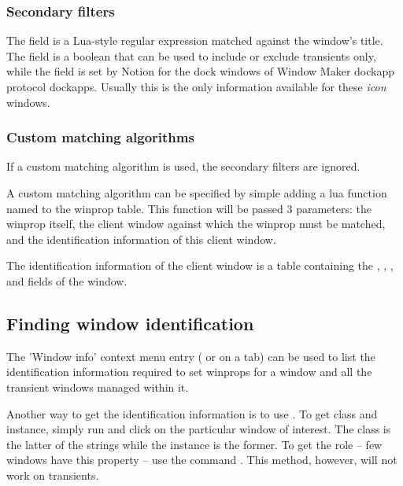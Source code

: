 \subsubsection{Secondary filters}

The  field is a Lua-style regular expression matched against
the window's title. The  field is a boolean that can
be used to include or exclude transients only, while the 
field is set by Notion for the dock windows of Window Maker dockapp protocol
dockapps. Usually this is the only information available for these 
\emph{icon} windows. 

\subsubsection{Custom matching algorithms}

If a custom matching algorithm is used, the secondary filters are ignored.

A custom matching algorithm can be specified by simple adding a lua function
named  to the winprop table. This function will be passed 3 
parameters: the winprop itself, the client window against which the winprop
must be matched, and the identification information of this client window. 

The identification information of the client window is a table containing the
,
, 
,
 and
 fields of the 
window.


\subsection{Finding window identification}

The 'Window info' context menu entry ( or  on a tab)
can be used to list the identification information required to set winprops
for a window and all the transient windows managed within it. 

Another way to get the identification information is to use .
To get class and instance, simply run 
and click on the particular window of interest. The class is the latter of
the strings while the instance is the former.  To get the role -- few
windows have this property -- use the command . 
This method, however, will not work on transients. 

